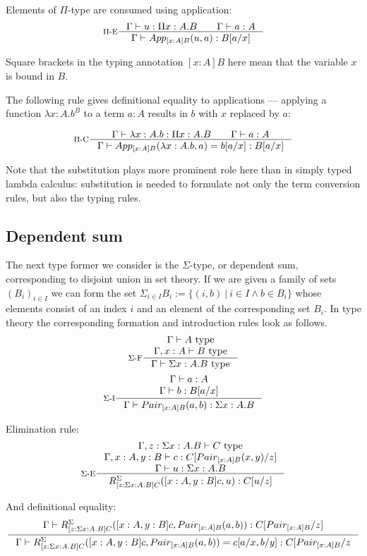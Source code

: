 Elements of $\Pi$-type are consumed using application:
\[
  \inference[$\Pi$-E]{\Gamma \vdash u : \Pi x:A. B \qquad \Gamma \vdash a : A}
  {\Gamma \vdash App_{[x:A]B}(u, a): B[a / x]}
\]

Square brackets in the typing annotation $[x : A] B$ here mean that the
variable $x$ is bound in $B$.

The following rule gives definitional equality to applications --- applying a
function $\lambda x : A. b^B$ to a term $a : A$ results in $b$ with $x$
replaced by $a$:

\[
  \inference[$\Pi$-C]{\Gamma \vdash \lambda x : A. b : \Pi x:A. B \qquad \Gamma \vdash a : A}
  {\Gamma \vdash App_{[x:A]B}(\lambda x : A. b, a) = b[a / x]: B [a / x]}
\]

Note that the substitution plays more prominent role here than in simply typed
lambda calculus: substitution is needed to formulate not only the term
conversion rules, but also the typing rules.

\subsection*{Dependent sum}

The next type former we consider is the $\Sigma$-type, or dependent sum,
corresponding to disjoint union in set theory. If we are given a family of sets
$(B_i)_{i \in I}$ we can form the set $\Sigma_{i \in I} B_i := \{ (i, b)~|~i
\in I \land b \in B_i\}$ whose elements consist of an index $i$ and an element
of the corresponding set $B_i$. In type theory the corresponding formation and
introduction rules look as follows.
\[
  \inference[$\Sigma$-F]{\Gamma \vdash A \text{ type}\\ \Gamma, x:A \vdash B \text{ type}}{\Gamma \vdash \Sigma x : A. B \text{ type}}
\]
\[
  \inference[$\Sigma$-I]{\Gamma \vdash a : A\\ \Gamma\vdash b: B[a / x]}{\Gamma \vdash Pair_{[x:A]B} (a,b) : \Sigma x : A. B}
\]

Elimination rule:
\[
  \inference[$\Sigma$-E]{\Gamma, z : \Sigma x: A. B \vdash C \text{ type}\\ \Gamma, x: A, y: B \vdash c : C[Pair_{[x:A]B}(x, y)/z]\\ \Gamma \vdash u : \Sigma x: A. B}
  {R^\Sigma_{[z : \Sigma x: A. B]C}([x : A, y: B]c, u): C[u/z]}
\]

And definitional equality:
\[
  \inference{\Gamma\vdash R^\Sigma_{[z : \Sigma x: A. B]C}([x : A, y: B]c, Pair_{[x:A]B}(a,b)): C[Pair_{[x:A]B}/z]}
  {\Gamma\vdash R^\Sigma_{[z : \Sigma x: A. B]C}([x : A, y: B]c, Pair_{[x:A]B}(a,b)) = c[a/x,b/y] : C [Pair_{[x:A]B}/z}
\]

